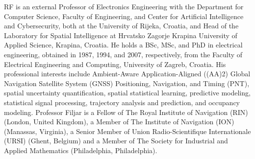 \let\LaTeXcline\cline\documentclass[sn-mathphys-num]{sn-jnl}\let\cline\LaTeXcline
\begin{document}
RF is an external Professor of Electronics Engineering with the Department for Computer Science, Faculty of Engineering, and Center for Artificial Intelligence and Cybersecurity, both at the University of Rijeka, Croatia, and Head of the Laboratory for Spatial Intelligence at Hrvatsko Zagorje Krapina University of Applied Science, Krapina, Croatia. He holds a BSc, MSc, and PhD in electrical engineering, obtained in 1987, 1994, and 2007, respectively, from the Faculty of Electrical Engineering and Computing, University of Zagreb, Croatia. His professional interests include Ambient-Aware Application-Aligned ((AA)2) Global Navigation Satellite System (GNSS) Positioning, Navigation, and Timing (PNT), spatial uncertainty quantification, spatial statistical learning, predictive modeling, statistical signal processing, trajectory analysis and prediction, and occupancy modeling. Professor Filjar is a Fellow of The Royal Institute of Navigation (RIN) (London, United Kingdom), a Member of The Institute of Navigation (ION) (Manassas, Virginia), a Senior Member of Union Radio-Scientifique Internationale (URSI) (Ghent, Belgium) and a Member of The Society for Industrial and Applied Mathematics  (Philadelphia, Philadelphia).


\end{document}
